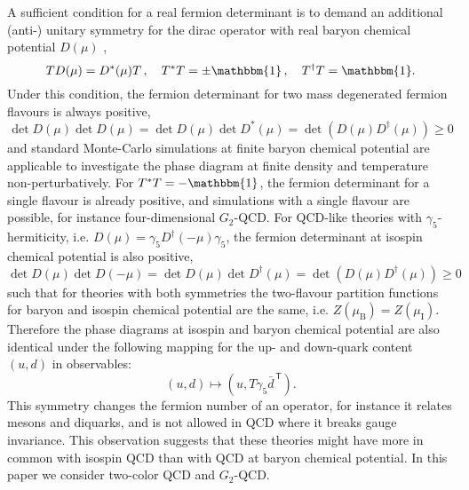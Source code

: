 \documentclass{PoS}
\newcommand{\id}{\mathbbm{1}}
\newcommand{\trnsp}{\mathsf{T}}
\begin{document}
A sufficient condition for a real fermion determinant is to demand an additional (anti-) unitary symmetry for the dirac operator with real baryon chemical potential $D(\mu)$ \cite{Kogut:2000ek},
\begin{equation}
 T D(\mu)= D^*(\mu) T\,,\quad T^*T=\pm \id\,,\quad T^\dagger T=\id.
\end{equation}
Under this condition, the fermion determinant for two mass degenerated fermion flavours is always positive,
\begin{equation}
 \det D(\mu) \det D(\mu)=\det D(\mu) \det D^*(\mu)=\det \left(D(\mu) D^\dagger(\mu)\right)\geq 0
\end{equation}
and standard Monte-Carlo simulations at finite baryon chemical potential are applicable to investigate the phase diagram at finite density and temperature non-perturbatively.
For $T^*T=-\id$, the fermion determinant for a single flavour is already positive, and simulations with a single flavour are possible, for instance four-dimensional $G_2$-QCD.
For QCD-like theories with $\gamma_5$-hermiticity, i.e. $D(\mu)=\gamma_5 D^\dagger(-\mu) \gamma_5$, the fermion determinant at isospin chemical potential is also positive,
\begin{equation}
 \det D(\mu) \det D(-\mu)=\det D(\mu) \det D^\dagger(\mu)=\det \left(D(\mu) D^\dagger(\mu)\right)\geq 0
\end{equation}
such that for theories with both symmetries the two-flavour partition functions for baryon and isospin chemical potential are the same, i.e.  $Z(\mu_\text{B})=Z(\mu_\text{I})$.
Therefore the phase diagrams at isospin and baryon chemical potential are also identical under the following mapping for the up- and down-quark content $(u,d)$ in observables:
\begin{equation}
 (u,d) \mapsto (u,T \gamma_5 \bar{d}^{\,\trnsp}).
\end{equation}
This symmetry changes the fermion number of an operator, for instance it relates mesons and diquarks, and is not allowed in QCD where it breaks gauge invariance. %
This observation suggests that these theories might have more in common with isospin QCD than with QCD at baryon chemical potential.
In this paper we consider two-color QCD and $G_2$-QCD.
\end{document}
